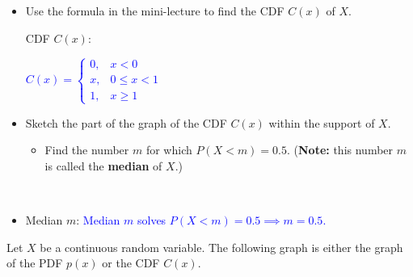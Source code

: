 \documentclass[10pt]{article}
\begin{document}
\begin{itemize}
\item[(a)]  Use the formula in the mini-lecture to find the CDF $C(x)$ of $X$.


CDF $C(x)$:

\vfill
\textcolor{blue}{
$C(x) = \begin{cases}
0, & x<0\\
x, & 0\le x < 1\\
1, & x \ge 1
\end{cases}$
}

\item[(b)] Sketch the part of the graph of the CDF $C(x)$ within the support of $X$.

\bigskip

\begin{minipage}[t]{0.45\textwidth}
    \begin{itemize}
    \item[(c)] Find the number $m$ for which $P(X<m)=0.5$. ({\bf Note:} this number $m$ is called the {\bf median} of $X$.)
    \end{itemize}
\end{minipage}\\

\item[(c)] Median $m$:
\textcolor{blue}{Median $m$ solves $P(X<m)=0.5 \implies m=0.5$.}

\vfill
\end{itemize}
 Let $X$ be a continuous random variable. The following graph is either the graph of the PDF $p(x)$ or the CDF $C(x)$.
\end{document}
